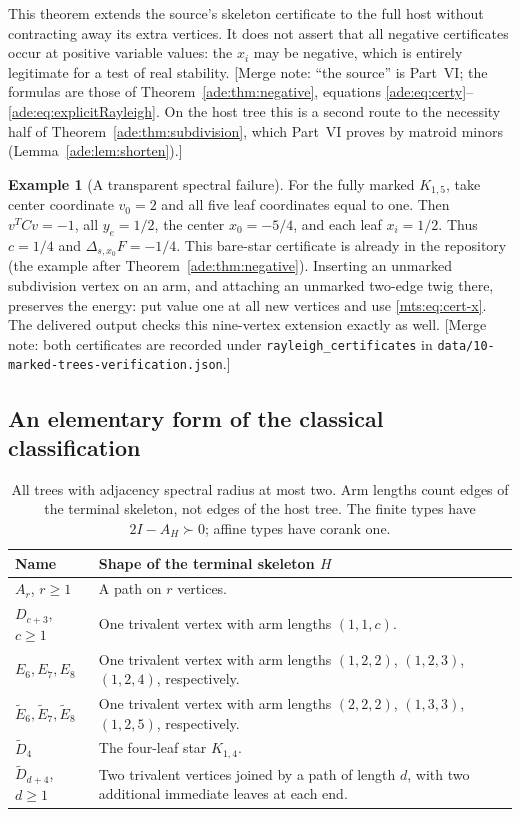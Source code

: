 \documentclass[11pt]{article}
\numberwithin{equation}{section}
\theoremstyle{definition}
\newtheorem{example}[theorem]{Example}%
\newcommand{\del}{\Delta}
\begin{document}
This theorem extends the source's skeleton certificate to the full host
without contracting away its extra vertices. It does not assert that all
negative certificates occur at positive variable values: the $x_i$ may be
negative, which is entirely legitimate for a test of real stability.
[Merge note: ``the source'' is Part~VI; the formulas are those of
Theorem~\ref{ade:thm:negative}, equations
\eqref{ade:eq:certy}--\eqref{ade:eq:explicitRayleigh}. On the host tree
this is a second route to the necessity half of
Theorem~\ref{ade:thm:subdivision}, which Part~VI proves by matroid minors
(Lemma~\ref{ade:lem:shorten}).]

\begin{example}[A transparent spectral failure]
For the fully marked $K_{1,5}$, take center coordinate $v_0=2$ and all five
leaf coordinates equal to one. Then $v^TCv=-1$, all $y_e=1/2$, the center
$x_0=-5/4$, and each leaf $x_i=1/2$. Thus $c=1/4$ and
$\del_{s,x_0}F=-1/4$. This bare-star certificate is already in the
repository (the example after Theorem~\ref{ade:thm:negative}). Inserting an unmarked subdivision vertex on an arm, and
attaching an unmarked two-edge twig there, preserves the energy: put value
one at all new vertices and use \eqref{mts:eq:cert-x}. The delivered output
checks this nine-vertex extension exactly as well.
[Merge note: both certificates are recorded under
\texttt{rayleigh\_certificates} in
\nolinkurl{data/10-marked-trees-verification.json}.]
\end{example}

\subsection{An elementary form of the classical classification}

\begin{table}[htbp]
\centering\small
\begin{tabularx}{\textwidth}{@{}p{}X@{}}
\toprule
Name & Shape of the terminal skeleton $H$\\
\midrule
$A_r$, $r\ge1$ & A path on $r$ vertices.\\
$D_{c+3}$, $c\ge1$ & One trivalent vertex with arm lengths $(1,1,c)$.\\
$E_6,E_7,E_8$ & One trivalent vertex with arm lengths
$(1,2,2)$, $(1,2,3)$, $(1,2,4)$, respectively.\\
$\widetilde E_6,\widetilde E_7,\widetilde E_8$ & One trivalent vertex with
arm lengths $(2,2,2)$, $(1,3,3)$, $(1,2,5)$, respectively.\\
$\widetilde D_4$ & The four-leaf star $K_{1,4}$.\\
$\widetilde D_{d+4}$, $d\ge1$ & Two trivalent vertices joined by a path of
length $d$, with two additional immediate leaves at each end.\\
\bottomrule
\end{tabularx}
\caption{All trees with adjacency spectral radius at most two. Arm lengths
count edges of the terminal skeleton, not edges of the host tree. The
finite types have $2I-A_H\succ0$; affine types have corank one.}
\label{mts:tab:ADE}
\end{table}
\end{document}
